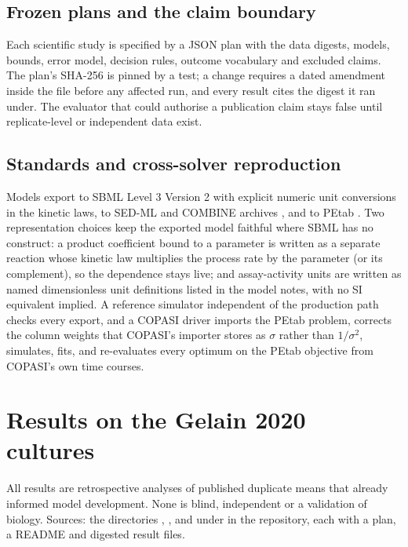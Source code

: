 \documentclass[11pt,a4paper]{article}
\begin{document}
\subsection{Frozen plans and the claim boundary}

Each scientific study is specified by a JSON plan with the data digests,
models, bounds, error model, decision rules, outcome vocabulary and
excluded claims. The plan's SHA-256 is pinned by a test; a change requires
a dated amendment inside the file before any affected run, and every result
cites the digest it ran under. The evaluator that could authorise a
publication claim stays false until replicate-level or independent data
exist.

\subsection{Standards and cross-solver reproduction}

Models export to SBML Level 3 Version 2 \citep{hucka2003} with explicit
numeric unit conversions in the kinetic laws, to SED-ML \citep{waltemath2011}
and COMBINE archives \citep{bergmann2014}, and to PEtab
\citep{schmiester2021}. Two representation choices keep the exported model
faithful where SBML has no construct: a product coefficient bound to a
parameter is written as a separate reaction whose kinetic law multiplies
the process rate by the parameter (or its complement), so the dependence
stays live; and assay-activity units are written as named dimensionless
unit definitions listed in the model notes, with no SI equivalent implied.
A reference simulator independent of the production path checks every
export, and a COPASI driver imports the PEtab problem, corrects the column
weights that COPASI's importer stores as $\sigma$ rather than $1/\sigma^2$,
simulates, fits, and re-evaluates every optimum on the PEtab objective from
COPASI's own time courses.

\section{Results on the Gelain 2020 cultures}

All results are retrospective analyses of published duplicate means that
already informed model development. None is blind, independent or a
validation of biology. Sources: the directories ,
,  and
 under  in the repository,
each with a plan, a README and digested result files.
\end{document}
